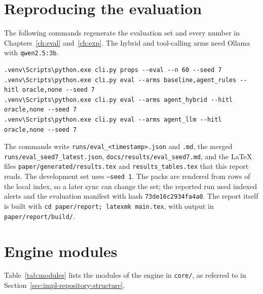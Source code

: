 \section{Reproducing the evaluation}
\label{sec:app-run-eval}

The following commands regenerate the evaluation set and every number in Chapters~\ref{ch:eval} and~\ref{ch:exp}. The hybrid and tool-calling arms need Ollama with \texttt{qwen2.5:3b}.
\par\smallskip\noindent\begin{minipage}[t]{\linewidth}\vspace{-\topsep}\begin{lstlisting}[language={},numbers=none,breakatwhitespace=true]
.venv\Scripts\python.exe cli.py props --eval --n 60 --seed 7
.venv\Scripts\python.exe cli.py eval --arms baseline,agent_rules --hitl oracle,none --seed 7
.venv\Scripts\python.exe cli.py eval --arms agent_hybrid --hitl oracle,none --seed 7
.venv\Scripts\python.exe cli.py eval --arms agent_llm --hitl oracle,none --seed 7
\end{lstlisting}\end{minipage}\par\smallskip\noindent
\begin{sloppypar}The commands write \texttt{runs/eval\_<timestamp>.json} and \texttt{.md}, the merged \texttt{runs/eval\_seed7\_latest.json}, \texttt{docs/results/eval\_seed7.md}, and the LaTeX files \texttt{paper/generated/results.tex} and \texttt{results\_tables.tex} that this report reads. The development set uses \texttt{--seed 1}. The packs are rendered from rows of the local index, so a later sync can change the set; the reported run used  indexed alerts and the evaluation manifest with hash \texttt{73de16c2934fa4a0}. The report itself is built with \texttt{cd paper/report; latexmk main.tex}, with output in \texttt{paper/report/build/}.\end{sloppypar}

\section{Engine modules}
\label{sec:app-run-modules}

Table~\ref{tab:modules} lists the modules of the engine in \texttt{core/}, as referred to in
Section~\ref{sec:impl-repository-structure}.

